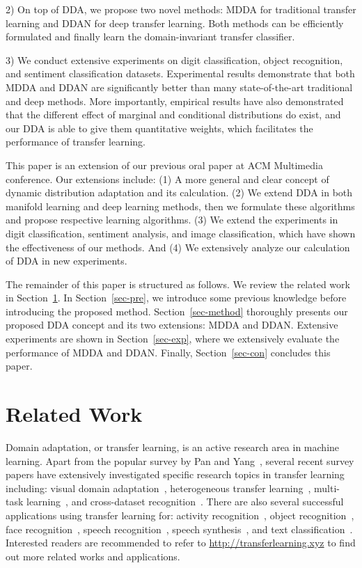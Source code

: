 \documentclass[acmsmall]{acmart}
\begin{document}
2) On top of DDA, we propose two novel methods: MDDA for traditional transfer learning and DDAN for deep transfer learning. Both methods can be efficiently formulated and finally learn the domain-invariant transfer classifier.

3) We conduct extensive experiments on digit classification, object recognition, and sentiment classification datasets. Experimental results demonstrate that both MDDA and DDAN are significantly better than many state-of-the-art traditional and deep methods. More importantly, empirical results have also demonstrated that the different effect of marginal and conditional distributions do exist, and our DDA is able to give them quantitative weights, which facilitates the performance of transfer learning.

This paper is an extension of our previous oral paper at ACM Multimedia conference\cite{wang2018visual}. Our extensions include: (1) A more general and clear concept of dynamic distribution adaptation and its calculation. (2) We extend DDA in both manifold learning and deep learning methods, then we formulate these algorithms and propose respective learning algorithms. (3) We extend the experiments in digit classification, sentiment analysis, and image classification, which have shown the effectiveness of our methods. And (4) We extensively analyze our calculation of DDA in new experiments.

The remainder of this paper is structured as follows. We review the related work in Section~\ref{sec-related}. In Section~\ref{sec-pre}, we introduce some previous knowledge before introducing the proposed method. Section~\ref{sec-method} thoroughly presents our proposed DDA concept and its two extensions: MDDA and DDAN. Extensive experiments are shown in Section~\ref{sec-exp}, where we extensively evaluate the performance of MDDA and DDAN. Finally, Section~\ref{sec-con} concludes this paper.

\section{Related Work}
\label{sec-related}

Domain adaptation, or transfer learning, is an active research area in machine learning. Apart from the popular survey by Pan and Yang~\cite{pan2010survey}, several recent survey papers have extensively investigated specific research topics in transfer learning including: visual domain adaptation~\cite{wang2018visual,wang2019easy}, heterogeneous transfer learning~\cite{day2017survey,friedjungova2017asymmetric}, multi-task learning~\cite{zhang2017survey}, and cross-dataset recognition~\cite{zhang2017cross}. There are also several successful applications using transfer learning for: activity recognition~\cite{wang2018stratified,wang2018deep,chen2019fedhealth,chen2019cross}, object recognition~\cite{ghifary2017scatter}, face recognition~\cite{ren2014transfer}, speech recognition~\cite{yi2019language}, speech synthesis~\cite{jia2018transfer}, and text classification~\cite{do2006transfer}. Interested readers are recommended to refer to \url{http://transferlearning.xyz} to find out more related works and applications.
\end{document}
